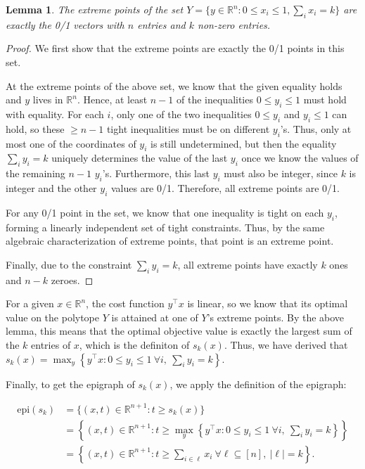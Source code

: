 \documentclass[11pt,letterpaper]{article}
\newtheorem{lemma}[theorem]{Lemma}
\theoremstyle{definition}
\newcommand{\reals}{\mathbb{R}}
\begin{document}
\begin{lemma}
    The extreme points of the set $Y =\{y\in \reals^n:0\leq x_i\leq 1, \sum_i x_i = k\}$ are exactly the 0/1 vectors with $n$ entries and $k$ non-zero entries.
\end{lemma}
\begin{proof}
    We first show that the extreme points are exactly the 0/1 points in this set. 
    
    At the extreme points of the above set, we know that the given equality holds and $y$ lives in $\reals^n$. 
    Hence, at least $n-1$ of the inequalities $0\leq y_i\leq 1$ must hold with equality. 
    For each $i$, only one of the two inequalities $0\leq y_i$ and $y_i\leq 1$ can hold, so these $\geq n-1$ tight inequalities must be on different $y_i$'s.
    Thus, only at most one of the coordinates of $y_i$ is still undetermined, but then the equality $\sum_i y_i = k$ uniquely determines the value of the last $y_i$ once we know the values of the remaining $n-1$ $y_i$'s.
    Furthermore, this last $y_i$ must also be integer, since $k$ is integer and the other $y_i$ values are 0/1. 
    Therefore, all extreme points are 0/1.

    For any 0/1 point in the set, we know that one inequality is tight on each $y_i$, forming a linearly independent set of tight constraints. 
    Thus, by the same algebraic characterization of extreme points, that point is an extreme point.

    Finally, due to the constraint $\sum_i y_i = k$, all extreme points have exactly $k$ ones and $n-k$ zeroes.
\end{proof}

For a given $x\in \reals^n$, the cost function $y^\top x$ is linear, so we know that its optimal value on the polytope $Y$ is attained at one of $Y$'s extreme points.
By the above lemma, this means that the optimal objective value is exactly the largest sum of the $k$ entries of $x$, which is the definiton of $s_k(x)$.
Thus, we have derived that $s_k(x) = \max_y \left\{ y^\top x : 0 \leq y_i \leq 1 \ \forall i, \ \sum_i y_i = k \right\}.$

Finally, to get the epigraph of $s_k(x)$, we apply the definition of the epigraph:

\begin{align*}
    \mathrm{epi}(s_k) &= \{(x,t)\in \reals^{n+1}: t \geq s_k(x)\} \\
    &= \left\{(x,t)\in \reals^{n+1}: t \geq \max_y \left\{ y^\top x : 0 \leq y_i \leq 1 \ \forall i, \ \sum_i y_i = k \right\}\right\} \\
    &= \left\{(x,t)\in \reals^{n+1}: t \geq \sum_{i\in \ell} x_i\ \forall \ell\subseteq [n], \ |\ell| = k \right\} .
\end{align*}
\end{document}
